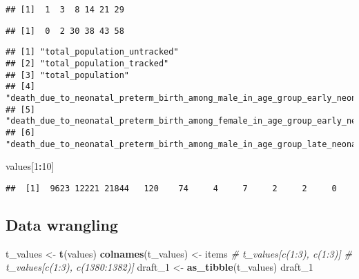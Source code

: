 \documentclass[]{article}
\newenvironment{Shaded}{\begin{snugshade}}{\end{snugshade}}
\newcommand{\CommentTok}[1]{\textcolor[rgb]{0.56,0.35,0.01}{\textit{#1}}}
\newcommand{\DecValTok}[1]{\textcolor[rgb]{0.00,0.00,0.81}{#1}}
\newcommand{\KeywordTok}[1]{\textcolor[rgb]{0.13,0.29,0.53}{\textbf{#1}}}
\newcommand{\NormalTok}[1]{#1}
\newcommand{\OperatorTok}[1]{\textcolor[rgb]{0.81,0.36,0.00}{\textbf{#1}}}
\newcommand{\StringTok}[1]{\textcolor[rgb]{0.31,0.60,0.02}{#1}}
\begin{document}
\begin{verbatim}
## [1]  1  3  8 14 21 29
\end{verbatim}

\begin{Shaded}
\end{Shaded}

\begin{verbatim}
## [1]  0  2 30 38 43 58
\end{verbatim}

\begin{Shaded}
\end{Shaded}

\begin{verbatim}
## [1] "total_population_untracked"                                                  
## [2] "total_population_tracked"                                                    
## [3] "total_population"                                                            
## [4] "death_due_to_neonatal_preterm_birth_among_male_in_age_group_early_neonatal"  
## [5] "death_due_to_neonatal_preterm_birth_among_female_in_age_group_early_neonatal"
## [6] "death_due_to_neonatal_preterm_birth_among_male_in_age_group_late_neonatal"
\end{verbatim}

\begin{Shaded}
\begin{Highlighting}[]
\NormalTok{values[}\DecValTok{1}\OperatorTok{:}\DecValTok{10}\NormalTok{]}
\end{Highlighting}
\end{Shaded}

\begin{verbatim}
##  [1]  9623 12221 21844   120    74     4     7     2     2     0
\end{verbatim}

\hypertarget{data-wrangling}{%
\subsection{Data wrangling}\label{data-wrangling}}

\begin{Shaded}
\begin{Highlighting}[]
\NormalTok{t_values <-}\StringTok{ }\KeywordTok{t}\NormalTok{(values)}
\KeywordTok{colnames}\NormalTok{(t_values) <-}\StringTok{ }\NormalTok{items}
\CommentTok{# t_values[c(1:3), c(1:3)]}
\CommentTok{# t_values[c(1:3), c(1380:1382)]}
\NormalTok{draft_}\DecValTok{1}\NormalTok{ <-}\StringTok{ }\KeywordTok{as_tibble}\NormalTok{(t_values)}
\NormalTok{draft_}\DecValTok{1}
\end{Highlighting}
\end{Shaded}
\end{document}
